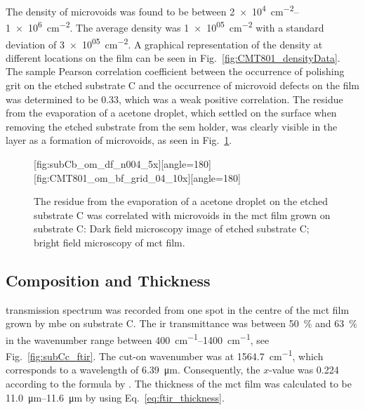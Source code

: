 The density of microvoids was found to be between \SIrange{2e+4}{1e+6}{\centi\metre^{-2}}. The average density was \SI{1e+05}{\centi\metre^{-2}} with a standard deviation of \SI{3e+05}{\centi\metre^{-2}}. A graphical representation of the density at different locations on the film can be seen in Fig.~\ref{fig:CMT801_densityData}. The sample Pearson correlation coefficient between the occurrence of polishing grit on the etched substrate C and the occurrence of microvoid defects on the film was determined to be \SI{0.33}{}, which was a weak positive correlation. The residue from the evaporation of a acetone droplet, which settled on the surface when removing the etched substrate from the \ac{sem} holder, was clearly visible in the layer as a formation of microvoids, as seen in Fig.~\ref{fig:subCc_microvoids_correlation}.

\begin{figure}[htbp]
    \centering
    [fig:subCb_om_df_n004_5x][angle=180]
    \hfill
    [fig:CMT801_om_bf_grid_04_10x][angle=180]
    \caption[Residue on etched substrate C visible as microvoids in the film.]{The residue from the evaporation of a acetone droplet on the etched substrate C was correlated with microvoids in the \ac{mct} film grown on substrate C:  Dark field microscopy image of etched substrate C;  bright field microscopy of \ac{mct} film.}\label{fig:subCc_microvoids_correlation}
\end{figure}


\subsection{Composition and Thickness}

 transmission spectrum was recorded from one spot in the centre of the \ac{mct} film grown by \ac{mbe} on substrate C. The \ac{ir} transmittance was between \SI{50}{\percent} and \SI{63}{\percent} in the wavenumber range between \SIrange{400}{1400}{\centi\metre^{-1}}, see Fig.~\ref{fig:subCc_ftir}. The cut-on wavenumber was at \SI{1564.7}{\centi\metre^{-1}}, which corresponds to a wavelength of \SI{6.39}{\micro\metre}. Consequently, the $x$-value was \SI{0.224}{} according to the formula by \citet{bricexxxxtttt}. The thickness of the \ac{mct} film was calculated to be \SIrange{11.0}{11.6}{\micro\metre} by using Eq.~\ref{eq:ftir_thickness}.

